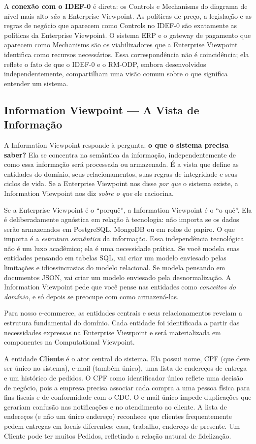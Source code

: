 A \textbf{conexão com o IDEF-0} é direta: os Controls e Mechanisms do diagrama
de nível mais alto \emph{são} a Enterprise Viewpoint. As políticas de preço,
a legislação e as regras de negócio que aparecem como Controls no IDEF-0 são
exatamente as políticas da Enterprise Viewpoint. O sistema ERP e o gateway de
pagamento que aparecem como Mechanisms são os viabilizadores que a Enterprise
Viewpoint identifica como recursos necessários. Essa correspondência não é
coincidência; ela reflete o fato de que o IDEF-0 e o RM-ODP, embora
desenvolvidos independentemente, compartilham uma visão comum sobre o que
significa entender um sistema.

\subsection{Information Viewpoint --- A Vista de Informação}

A Information Viewpoint responde à pergunta: \textbf{o que o sistema precisa
saber?} Ela se concentra na semântica da informação, independentemente de como
essa informação será processada ou armazenada. É a vista que define as entidades
do domínio, seus relacionamentos, suas regras de integridade e seus ciclos de vida.
Se a Enterprise Viewpoint nos disse \emph{por que} o sistema existe, a Information
Viewpoint nos diz \emph{sobre o que} ele raciocina.

Se a Enterprise Viewpoint é o ``porquê'', a Information Viewpoint é o ``o quê''.
Ela é deliberadamente agnóstica em relação à tecnologia: não importa se os dados
serão armazenados em PostgreSQL, MongoDB ou em rolos de papiro. O que importa
é a \emph{estrutura semântica} da informação. Essa independência tecnológica não
é um luxo acadêmico; ela é uma necessidade prática. Se você modela suas entidades
pensando em tabelas SQL, vai criar um modelo enviesado pelas limitações e
idiossincrasias do modelo relacional. Se modela pensando em documentos JSON, vai
criar um modelo enviesado pela desnormalização. A Information Viewpoint pede que
você pense nas entidades como \emph{conceitos do domínio}, e só depois se
preocupe com como armazená-las.

Para nosso e-commerce, as entidades centrais e seus relacionamentos revelam a
estrutura fundamental do domínio. Cada entidade foi identificada a partir das
necessidades expressas na Enterprise Viewpoint e será materializada em componentes
na Computational Viewpoint.

A entidade \textbf{Cliente} é o ator central do sistema. Ela possui nome, CPF
(que deve ser único no sistema), e-mail (também único), uma lista de endereços de
entrega e um histórico de pedidos. O CPF como identificador único reflete uma
decisão de negócio, pois a empresa precisa associar cada compra a uma pessoa física
para fins fiscais e de conformidade com o CDC. O e-mail único impede duplicações
que gerariam confusão nas notificações e no atendimento ao cliente. A lista de
endereços (e não um único endereço) reconhece que clientes frequentemente pedem
entregas em locais diferentes: casa, trabalho, endereço de presente. Um
Cliente pode ter muitos Pedidos, refletindo a relação natural de fidelização.

